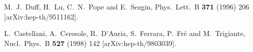 \documentclass[12pt,a4paper]{article}
\begin{document}
\begin{thebibliography}{40}
M.~J.~Duff, H.~Lu, C.~N.~Pope and E.~Sezgin,
Phys.\ Lett.\ B {\bf 371} (1996) 206
[arXiv:hep-th/9511162].

L.~Castellani, A.~Ceresole, R.~D'Auria, S.~Ferrara, P.~Fr\'e 
and M.~Trigiante,
Nucl.\ Phys.\ B {\bf 527} (1998) 142
[arXiv:hep-th/9803039].



\end{thebibliography}


\end{document}
